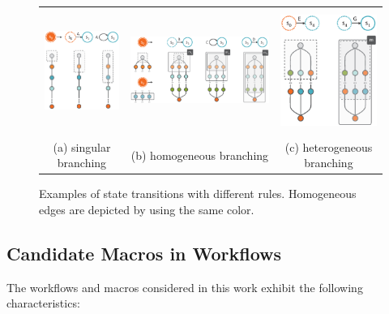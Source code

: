 \begin{figure}[t!]
\centering
\begin{tabular}{@{}ccc@{}}
\includegraphics[height=40mm]{images/automacron/States1.eps}&
\includegraphics[height=40mm]{images/automacron/States2.eps}&
\includegraphics[height=40mm]{images/automacron/States3.eps}\\
(a) singular branching & (b) homogeneous branching & (c) heterogeneous branching
\end{tabular}
\caption{Examples of state transitions with different rules. Homogeneous edges are depicted by using the same color.}
\vspace{-4mm}
\label{fig:States}
\end{figure}
\subsection{Candidate Macros in Workflows}
\label{sec:Conditions}
%
The workflows and macros considered in this work exhibit the following characteristics: 

